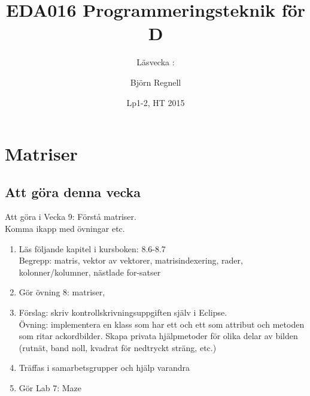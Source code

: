 \documentclass{lecturenotes}
\title[Föreläsningsanteckningar EDA016, 2015]{EDA016 Programmeringsteknik för D}
\subtitle{Läsvecka \vecka: \tema}
\author{Björn Regnell}
\institute{Datavetenskap, LTH}
\date{Lp1-2, HT 2015}
\renewcommand{\vecka}{9}
\newcommand{\tema}{Matriser}
\begin{document}
\frame{\titlepage}
\setnextsection{\vecka}
\section[Vecka \vecka: \tema]{\tema}
\frame{\tableofcontents}

\subsection{Att göra denna vecka}
\begin{Slide}{Att göra i Vecka \vecka: Förstå matriser. \\ Komma ikapp med övningar etc.}
\begin{enumerate}
\item Läs följande kapitel i kursboken:  8.6-8.7 \\  
Begrepp: matris, vektor av vektorer, matrisindexering, rader, kolonner/kolumner, nästlade for-satser
\item Gör övning 8: matriser, 
\item Förslag: skriv kontrollskrivningsuppgiften själv i Eclipse. \\ {\small Övning: implementera en klass  som har ett  och ett  som attribut och metoden  som ritar ackordbilder. Skapa privata hjälpmetoder för olika delar av bilden (rutnät, band noll, kvadrat för nedtryckt sträng, etc.)}
\item Träffas i samarbetsgrupper och hjälp varandra 
\item Gör Lab 7: Maze
\end{enumerate}
\end{Slide}
\end{document}
